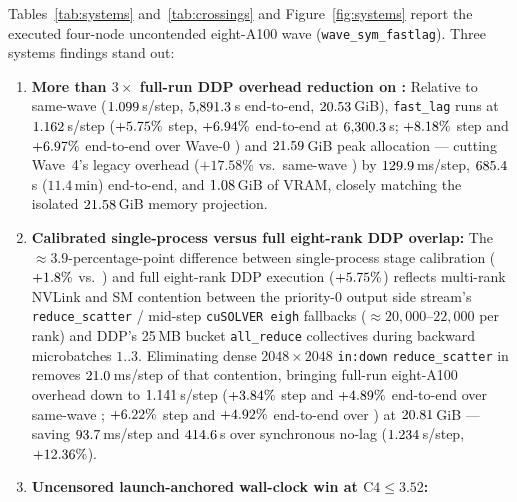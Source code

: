 Tables~\ref{tab:systems} and~\ref{tab:crossings} and Figure~\ref{fig:systems}
report the executed four-node uncontended eight-A100 wave
(\texttt{wave\_sym\_fastlag}). Three systems findings stand out:
\begin{enumerate}
\item \textbf{More than $3\times$ full-run DDP overhead reduction on
  :} Relative to same-wave  ($1.099$\,s/step,
  $5{,}891.3$\,s end-to-end, $20.53$\,GiB), \texttt{fast\_lag}
   runs at $1.162$\,s/step
  ($+5.75\%$ step, $+6.94\%$ end-to-end
  at $6{,}300.3$\,s; $+8.18\%$ step and
  $+6.97\%$ end-to-end over Wave-0 ) and
  $21.59$\,GiB peak allocation --- cutting Wave~4's legacy overhead
  ($+17.58\%$ vs.\ same-wave ) by $129.9$\,ms/step,
  $685.4$\,s ($11.4$\,min) end-to-end, and
  $1.08$\,GiB of VRAM, closely matching the isolated
  $21.58$\,GiB memory projection.
\item \textbf{Calibrated single-process versus full eight-rank DDP overlap:}
  The $\approx 3.9$-percentage-point difference between single-process stage
  calibration ($+1.8\%$ vs.\ ) and full eight-rank
  DDP execution ($+5.75\%$) reflects multi-rank NVLink and
  SM contention between the priority-0 output side stream's \texttt{reduce\_scatter}
  / mid-step \texttt{cuSOLVER eigh} fallbacks ($\approx 20{,}000$--$22{,}000$ per
  rank) and DDP's 25\,MB bucket \texttt{all\_reduce} collectives during backward
  microbatches $1..3$. Eliminating dense $2048\times 2048$ \texttt{in:down}
  \texttt{reduce\_scatter} in  removes $21.0$\,ms/step
  of that contention, bringing full-run eight-A100 overhead down to
  $1.141$\,s/step ($+3.84\%$ step and
  $+4.89\%$ end-to-end over same-wave ;
  $+6.22\%$ step and $+4.92\%$
  end-to-end over ) at $20.81$\,GiB --- saving
  $93.7$\,ms/step and $414.6$\,s over
  synchronous no-lag  ($1.234$\,s/step,
  $+12.36\%$).
\item \textbf{Uncensored launch-anchored wall-clock win at $\text{C4}\le 3.52$:}

\end{enumerate}
